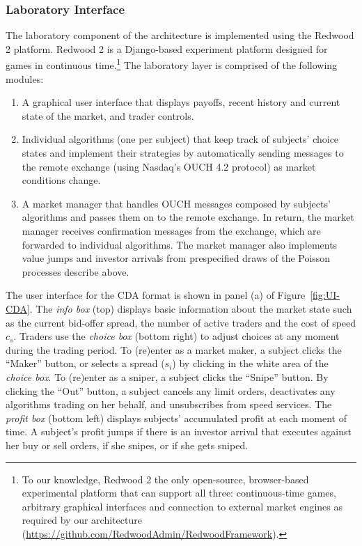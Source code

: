 \documentclass[12pt]{article}
\begin{document}
\subsubsection{Laboratory Interface}
The laboratory component of the architecture is implemented using the Redwood 2 platform. Redwood 2 is a Django-based experiment platform designed for games in continuous time.\footnote{To our knowledge, Redwood 2 the only open-source, browser-based experimental platform that can support all three: continuous-time games, arbitrary graphical interfaces and connection to external market engines as required by our architecture (\url{https://github.com/RedwoodAdmin/RedwoodFramework}).}  The laboratory layer is comprised of the following modules: 
\begin{enumerate}
\item A graphical user interface that displays payoffs, recent history and current state of the market, and trader controls.
\item Individual algorithms (one per subject) that keep track of subjects' choice states and implement their strategies by automatically sending messages to the remote exchange (using Nasdaq's OUCH 4.2 protocol) as market conditions change.
\item A market manager that handles OUCH messages composed by subjects' algorithms and passes them on to the remote exchange. In return, the market manager receives confirmation messages from the exchange, which are forwarded to individual algorithms. The market manager also implements value jumps and investor arrivals from prespecified draws of the Poisson processes describe above.
\end{enumerate}

The user interface for the CDA format is shown in panel (a) of Figure~\ref{fig:UI-CDA}. The \textit{info box} (top) displays basic information about the market state such as the current bid-offer spread, the number of active traders and the cost of speed $c_s$. Traders use the \textit{choice box} (bottom right) to adjust choices at any moment during the trading period. To (re)enter as a market maker, a subject clicks the “Maker” button, or selects a spread ($s_i$) by clicking in the white area of the \textit{choice box}. To (re)enter as a sniper, a subject clicks the “Snipe” button. By clicking the “Out” button, a subject cancels any limit orders, deactivates any algorithms trading on her behalf, and unsubscribes from speed services. The \textit{profit box} (bottom left) displays subjects’ accumulated profit at each moment of time. A subject’s profit jumps if there is an investor arrival that executes against her buy or sell orders, if she snipes, or if she gets sniped. 
\end{document}
